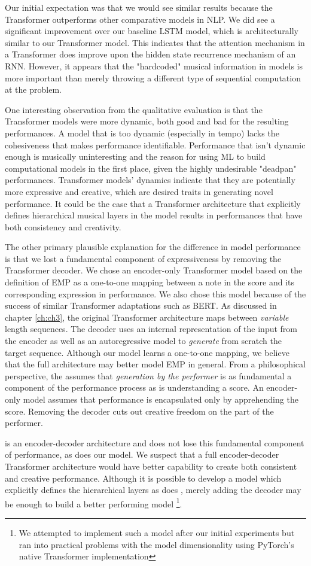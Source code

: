Our initial expectation was that we would see similar results because the Transformer outperforms other comparative models in NLP. We did see a significant improvement over our baseline LSTM model, which is architecturally similar to our Transformer model. This indicates that the attention mechanism in a Transformer does improve upon the hidden state recurrence mechanism of an RNN. However, it appears that the "hardcoded" musical information in \vnet{} models is more important than merely throwing a different type of sequential computation at the problem.

One interesting observation from the qualitative evaluation is that the Transformer models were more dynamic, both good and bad for the resulting performances. A model that is too dynamic (especially in tempo) lacks the cohesiveness that makes performance identifiable. Performance that isn't dynamic enough is musically uninteresting and the reason for using ML to build computational models in the first place, given the highly undesirable "deadpan" performances. Transformer models' dynamics indicate that they are potentially more expressive and creative, which are desired traits in generating novel performance. It could be the case that a Transformer architecture that explicitly defines hierarchical musical layers in the model results in performances that have both consistency and creativity. 

The other primary plausible explanation for the difference in model performance is that we lost a fundamental component of expressiveness by removing the Transformer decoder. We chose an encoder-only Transformer model based on the \vnetf{} definition of EMP as a one-to-one mapping between a note in the score and its corresponding expression in performance. We also chose this model because of the success of similar Transformer adaptations such as BERT\cite{devlin2018bert}. As discussed in chapter \ref{ch:ch3}, the original \ed{} Transformer architecture maps between \emph{variable} length sequences. The decoder uses an internal representation of the input from the encoder as well as an autoregressive model to \emph{generate} from scratch the target sequence. Although our model learns a one-to-one mapping, we believe that the full \ed{} architecture may better model EMP in general. From a philosophical perspective, the \ed{} assumes that \emph{generation by the performer} is as fundamental a component of the performance process as is understanding a score. An encoder-only model assumes that performance is encapsulated only by apprehending the score. Removing the decoder cuts out creative freedom on the part of the performer.

\vnet{} is an encoder-decoder architecture and does not lose this fundamental component of performance, as does our model. We suspect that a full encoder-decoder Transformer architecture would have better capability to create both consistent and creative performance. Although it is possible to develop a model which explicitly defines the hierarchical layers as does \vnet{}, merely adding the decoder may be enough to build a better performing model%
\footnote{We attempted to implement such a model after our initial experiments but ran into practical problems with the model dimensionality using PyTorch's native Transformer implementation}. 
